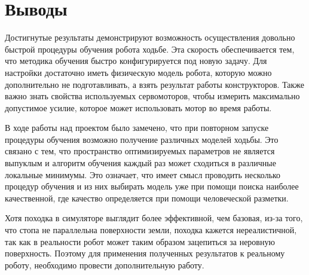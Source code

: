\chapter{Выводы}\label{ch:ch5}
Достигнутые результаты демонстрируют возможность осуществления довольно быстрой процедуры обучения робота ходьбе. Эта скорость обеспечивается тем, что методика обучения быстро конфигурируется под новую задачу. Для настройки достаточно иметь физическую модель робота, которую можно дополнительно не подготавливать, а взять результат работы конструкторов. Также важно знать свойства используемых сервомоторов, чтобы измерить максимально допустимое усилие, которое может использовать мотор во время работы.

В ходе работы над проектом было замечено, что при повторном запуске процедуры обучения возможно получение различных моделей ходьбы. Это связано с тем, что пространство оптимизируемых параметров не является выпуклым и алгоритм обучения каждый раз может сходиться в различные локальные минимумы. Это означает, что имеет смысл проводить несколько процедур обучения и из них выбирать модель уже при помощи поиска наиболее качественной, где качество определяется при помощи человеческой разметки.

Хотя походка в симуляторе выглядит более эффективной, чем базовая, из-за того, что стопа не параллельна поверхности земли, походка кажется нереалистичной, так как в реальности робот может таким образом зацепиться за неровную поверхность. Поэтому для применения полученных результатов к реальному роботу, необходимо провести дополнительную работу.